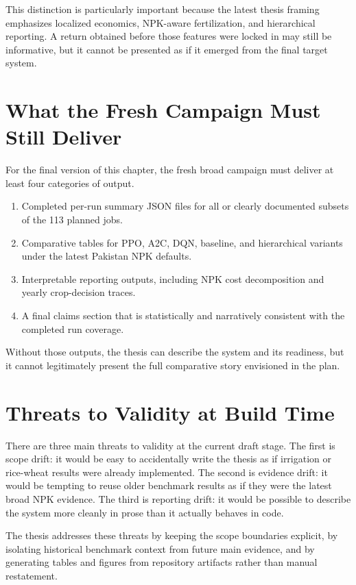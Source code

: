 This distinction is particularly important because the latest thesis framing emphasizes localized economics, NPK-aware fertilization, and hierarchical reporting. A return obtained before those features were locked in may still be informative, but it cannot be presented as if it emerged from the final target system.

\section{What the Fresh Campaign Must Still Deliver}

For the final version of this chapter, the fresh broad campaign must deliver at least four categories of output.
\begin{enumerate}[leftmargin=1.2cm]
    \item Completed per-run summary JSON files for all or clearly documented subsets of the 113 planned jobs.
    \item Comparative tables for PPO, A2C, DQN, baseline, and hierarchical variants under the latest Pakistan NPK defaults.
    \item Interpretable reporting outputs, including NPK cost decomposition and yearly crop-decision traces.
    \item A final claims section that is statistically and narratively consistent with the completed run coverage.
\end{enumerate}

Without those outputs, the thesis can describe the system and its readiness, but it cannot legitimately present the full comparative story envisioned in the plan.

\section{Threats to Validity at Build Time}

There are three main threats to validity at the current draft stage. The first is scope drift: it would be easy to accidentally write the thesis as if irrigation or rice-wheat results were already implemented. The second is evidence drift: it would be tempting to reuse older benchmark results as if they were the latest broad NPK evidence. The third is reporting drift: it would be possible to describe the system more cleanly in prose than it actually behaves in code.

The thesis addresses these threats by keeping the scope boundaries explicit, by isolating historical benchmark context from future main evidence, and by generating tables and figures from repository artifacts rather than manual restatement.

